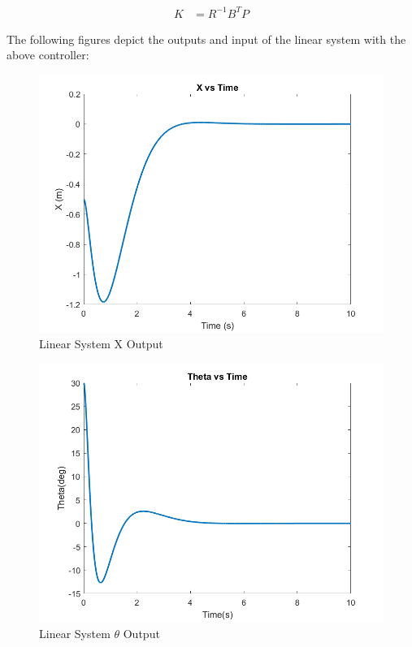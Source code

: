 \begin{equation*}
    \begin{split}
        K & = R^{-1}B^TP
    \end{split}
\end{equation*}

The following figures depict the outputs and input of the linear system with the above controller:

\begin{figure}[!ht]
    \centering
    \includegraphics[width=\linewidth]{figs/sf_lin_x.png}
    \caption{Linear System X Output}
    \label{}
\end{figure}

\begin{figure}[!ht]
    \centering
    \includegraphics[width=\linewidth]{figs/sf_lin_theta.png}
    \caption{Linear System $\theta$ Output}
    \label{}
\end{figure}

